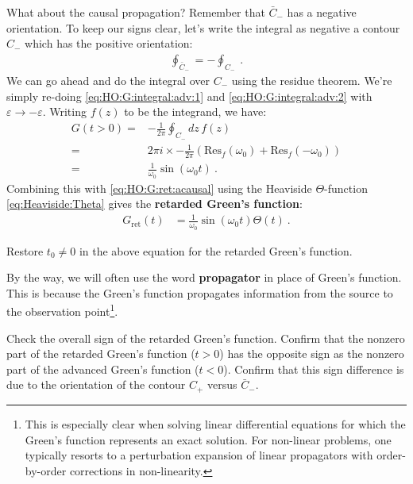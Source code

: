 What about the causal propagation? Remember that $\bar C_{-}$ has a negative orientation. To keep our signs clear, let's write the integral as negative a contour $C_-$  which has the positive orientation: 
\begin{align}
  \oint_{\bar C_-} = -\oint_{C_-} \ .
\end{align}
We can go ahead and do the integral over $C_-$ using the residue theorem. We're simply re-doing \eqref{eq:HO:G:integral:adv:1} and \eqref{eq:HO:G:integral:adv:2} with $\varepsilon\to -\varepsilon$. Writing $f(z)$ to be the integrand, we have:
\begin{align}
  G(t>0) =& 
  -\frac{1}{2\pi} \oint_{C_-}dz\, f(z)
  \\
  =&
  2\pi i \times -\frac{1}{2\pi} 
  \left(\text{Res}_f(\omega_0) + \text{Res}_f(-\omega_0)\right)
  \\
  =& \frac{1}{\omega_0}\sin(\omega_0 t) \ .
\end{align}
Combining this with \eqref{eq:HO:G:ret:acausal} using the Heaviside $\Theta$-function \eqref{eq:Heaviside:Theta} gives the \textbf{retarded Green's function}:
\begin{align}
  G_\text{ret}(t) &= 
  \frac{1}{\omega_0}
  \sin(\omega_0 t)
  \Theta(t) \ .
  \label{eq:HO:Gret:sin:theta}
\end{align}
\begin{exercise}
Restore $t_0\neq 0$ in the above equation for the retarded Green's function.
\end{exercise}
By the way, we will often use the word \textbf{propagator} in place of Green's function. This is because the Green's function propagates information from the source to the observation point\footnote{This is especially clear when solving linear differential equations for which the Green's function represents an exact solution. For non-linear problems, one typically resorts to a perturbation expansion of linear propagators with order-by-order corrections in non-linearity. %
}. 

\begin{exercise}
Check the overall sign of the retarded Green's function.  Confirm that the nonzero part of the retarded Green's function ($t>0$) has the opposite sign as the nonzero part of the advanced Green's function ($t<0$). Confirm that this sign difference is due to the orientation of the contour $C_+$ versus $\bar{C}_-$.
\end{exercise}

